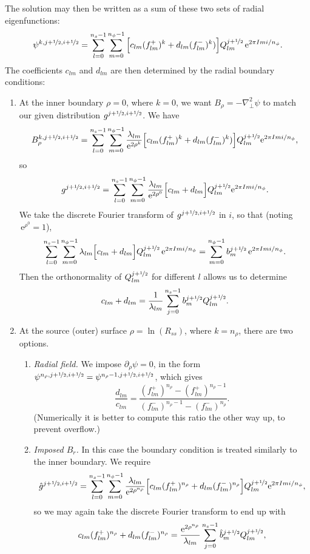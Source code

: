 \documentclass[11pt]{article}
\newcommand{\dy}{\partial}
\newcommand{\nr}{n_\rho}
\newcommand{\ns}{n_s}
\newcommand{\nph}{n_\phi}
\newcommand{\half}{\nicefrac{1}{2}}
\newcommand{\ex}{\,\mathrm{e}}
\begin{document}
The solution may then be written as a sum of these two sets of radial eigenfunctions:
\begin{equation}
\psi^{k,j+\half,i+\half} = \sum_{l=0}^{\ns-1}\sum_{m=0}^{\nph-1}\Big[c_{lm}(f_{lm}^+)^k + d_{lm}(f_{lm}^-)^k) \Big] Q_{lm}^{j+\half}\ex^{2\pi I mi/\nph}.
\label{eqn:psisum}
\end{equation}
The coefficients $c_{lm}$ and $d_{lm}$ are then determined by the radial boundary conditions:
\begin{enumerate}
\item At the inner boundary $\rho = 0$, where $k=0$, we want  $B_\rho = -\nabla^2_\perp\psi$ to match our given distribution $g^{j+\half,i+\half}$.
We have
\[
B_\rho^{k,j+\half,i+\half} = \sum_{l=0}^{\ns-1}\sum_{m=0}^{\nph-1}\frac{\lambda_{lm}}{\mathrm{e}^{2\rho^k}}\Big[c_{lm}(f_{lm}^+)^k + d_{lm}(f_{lm}^-)^k) \Big] Q_{lm}^{j+\half}\mathrm{e}^{2\pi I mi/\nph},
\]
so
\[
g^{j+\half,i+\half} = \sum_{l=0}^{\ns-1}\sum_{m=0}^{\nph-1}\frac{\lambda_{lm}}{\mathrm{e}^{2\rho^0}}\Big[c_{lm} + d_{lm}\Big] Q_{lm}^{j+\half}\mathrm{e}^{2\pi I mi/\nph}.
\]
We take the discrete Fourier transform of $g^{j+\half,i+\half}$ in $i$, so that (noting $\ex^{\rho^0}=1$),
\[
\sum_{l=0}^{\ns-1}\sum_{m=0}^{\nph-1}\lambda_{lm}
\Big[c_{lm} + d_{lm}\Big] Q_{lm}^{j+\half}\,\mathrm{e}^{2\pi I mi/\nph} = \sum_{m=0}^{\nph-1}b_m^{j+\half}\,\mathrm{e}^{2\pi I mi/\nph}.
\]
Then the orthonormality of $Q_{lm}^{j+\half}$ for different $l$ allows us to determine
\begin{equation}
c_{lm} + d_{lm} = \frac{1}{\lambda_{lm}}\sum_{j=0}^{\ns-1}b_m^{j+\half}Q_{lm}^{j+\half}.
\label{eqn:dc2}
\end{equation}
\item At the source (outer) surface $\rho=\ln(R_{ss})$, where $k=\nr$, there are two options.
\begin{enumerate}
\item  \emph{Radial field.} We impose $\dy_\rho\psi = 0$, in the form $\psi^{\nr,j+\half,i+\half}=\psi^{\nr-1,j+\half,i+\half}$, which gives
\begin{equation}
\frac{d_{lm}}{c_{lm}} = \frac{(f_{lm}^+)^{\nr} - (f_{lm}^+)^{\nr-1}}{(f_{lm}^-)^{\nr-1} - (f_{lm}^-)^{\nr}}.
\label{eqn:dc1}
\end{equation}
(Numerically it is better to compute this ratio the other way up, to prevent overflow.)
\item  \emph{Imposed $B_r$.} In this case the boundary condition is treated similarly to the inner boundary. We require
\[
\hat{g}^{j+\half,i+\half} = \sum_{l=0}^{\ns-1}\sum_{m=0}^{\nph-1}\frac{\lambda_{lm}}{\mathrm{e}^{2\rho^{n_\rho}}}\Big[c_{lm}(f_{lm}^+)^{n_\rho} + d_{lm}(f_{lm}^-)^{n_\rho}\Big] Q_{lm}^{j+\half}\mathrm{e}^{2\pi I mi/\nph},
\]
so we may again take the discrete Fourier transform to end up with
\begin{equation}
c_{lm}(f_{lm}^+)^{n_\rho} + d_{lm}(f_{lm}^-)^{n_\rho} = \frac{\mathrm{e}^{2\rho^{n_\rho}}}{\lambda_{lm}}\sum_{j=0}^{\ns-1}\hat{b}_m^{j+\half}Q_{lm}^{j+\half},
\label{eqn:dc3}
\end{equation}
\end{enumerate}
\end{enumerate}
\end{document}
